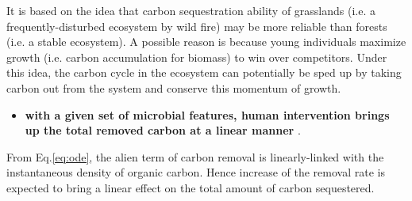 \documentclass[../thesis.tex]{subfiles} %
\begin{document}
It is based on the idea that carbon sequestration ability of grasslands (i.e. a frequently-disturbed ecosystem by wild fire) may be more reliable than forests (i.e. a stable ecosystem).\autocite{dass2018grasslands}  A possible reason is because young individuals maximize growth (i.e. carbon accumulation for biomass) to win over competitors.  Under this idea, the carbon cycle in the ecosystem can potentially be sped up by taking carbon out from the system and conserve this momentum of growth.

\begin{itemize}
    \item \textbf{with a given set of microbial features, human intervention brings up the total removed carbon at a linear manner}
    .
\end{itemize}

From Eq.\ref{eq:ode}, the alien term of carbon removal is linearly-linked with the instantaneous density of organic carbon.  Hence increase of the removal rate is expected to bring a linear effect on the total amount of carbon sequestered.
\end{document}
